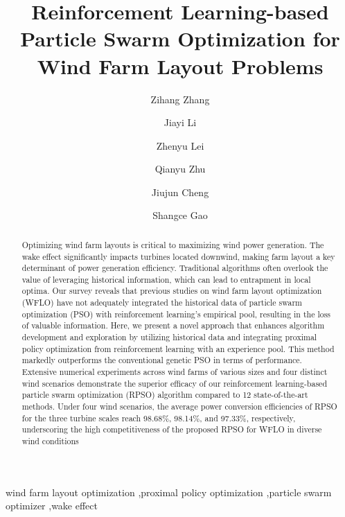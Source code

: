 \documentclass[review]{elsarticle}
\begin{document}
	\begin{frontmatter}
	\title{Reinforcement Learning-based Particle Swarm Optimization for Wind Farm Layout Problems}
	\author[label1]{Zihang Zhang} %
	\author[label1]{Jiayi Li}%
	\author[label1]{Zhenyu Lei} %
	\author[label1]{Qianyu Zhu} %
	\author[label2]{Jiujun Cheng}%
	\author[label1]{Shangce Gao}
	\address[label1]{Faculty of Engineering, University of Toyama, Toyama-shi, 930-8555 Japan.}
	\address[label2]{Key Laboratory of Embedded System and Service Computing, Ministry of Education, Tongji University, Shanghai, 200092 China.}
\begin{abstract}
Optimizing wind farm layouts is critical to maximizing wind power generation. The wake effect significantly impacts turbines located downwind, making farm layout a key determinant of power generation efficiency. Traditional algorithms often overlook the value of leveraging historical information, which can lead to entrapment in local optima. Our survey reveals that previous studies on wind farm layout optimization (WFLO) have not adequately integrated the historical data of particle swarm optimization (PSO) with reinforcement learning’s empirical pool, resulting in the loss of valuable information. Here, we present a novel approach that enhances algorithm development and exploration by utilizing historical data and integrating proximal policy optimization from reinforcement learning with an experience pool. This method markedly outperforms the conventional genetic PSO in terms of performance. Extensive numerical experiments across wind farms of various sizes and four distinct wind scenarios demonstrate the superior efficacy of our reinforcement learning-based particle swarm optimization (RPSO) algorithm compared to 12 state-of-the-art methods. Under four wind scenarios, the average power conversion efficiencies of RPSO for the three turbine scales reach 98.68$\%$, 98.14$\%$, and 97.33$\%$, respectively, underscoring the high competitiveness of the proposed RPSO for WFLO in diverse wind conditions

\end{abstract}

\begin{keyword}
wind farm layout optimization \sep proximal policy optimization \sep particle swarm optimizer  \sep wake effect
\end{keyword}

\end{frontmatter}
\end{document}
